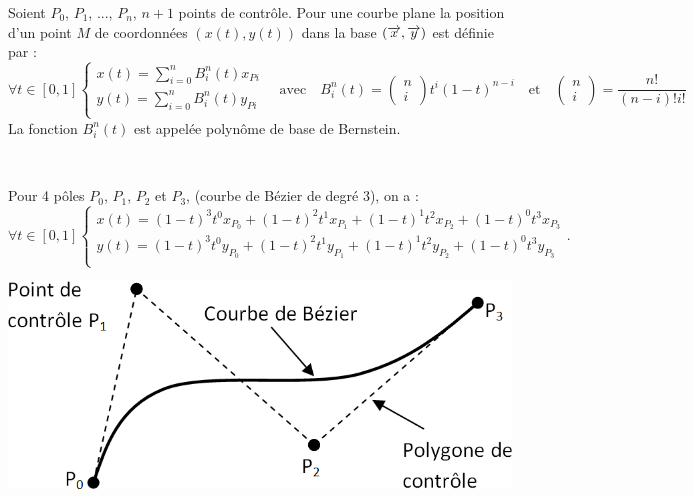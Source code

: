 \documentclass[10pt,fleqn]{article} %
\begin{document}
\begin{defi}
Soient $P_0$, $P_1$, ..., $P_{n}$, $n+1$ points de contrôle. %
Pour une courbe plane la position d'un point $M$ de coordonnées $\left( x(t),y(t) \right)$ dans la base $\left(\overrightarrow{x},\overrightarrow{y} \right)$ est définie par :
$$
\forall t \in [0,1]
\left\{
\begin{array}{l}
x(t)= \sum\limits_{i=0}^{n} B_i^n(t) x_{Pi} \\
y(t)= \sum\limits_{i=0}^{n} B_i^n(t) y_{Pi} \\
\end{array}
\right.
\quad \text{avec} \quad B_i^n(t) = \begin{pmatrix} n \\ i\end{pmatrix} t^i \left(1-t\right)^{n-i}
\quad \text{et} \quad  \begin{pmatrix} n \\ i\end{pmatrix} = \dfrac{n!}{\left(n-i \right) ! i !}
$$
La fonction $B_i^n(t)$ est appelée polynôme de base de Bernstein.
\end{defi}

\begin{exemple}~\\
\begin{minipage}[c]{0.7\linewidth}
Pour 4 pôles $P_0$, $P_1$, $P_2$ et $P_3$, (courbe de Bézier de degré 3), on a : 
$$
\forall t \in [0,1]
\left\{
\begin{array}{l}
x(t)=  \left(1-t \right)^3 t^0 x_{P_0} +\left(1-t \right)^2 t^1 x_{P_1} +\left(1-t \right)^1 t^2 x_{P_2} +\left(1-t \right)^0 t^3 x_{P_3}\\
y(t)=  \left(1-t \right)^3 t^0 y_{P_0} +\left(1-t \right)^2 t^1 y_{P_1} +\left(1-t \right)^1 t^2 y_{P_2} +\left(1-t \right)^0 t^3 y_{P_3}\\
\end{array}
\right..
$$ 
\end{minipage} \hfill
\begin{minipage}[c]{0.27\linewidth}
\includegraphics[width=\linewidth]{images/Courbe}
\end{minipage}
\end{exemple}
\end{document}
